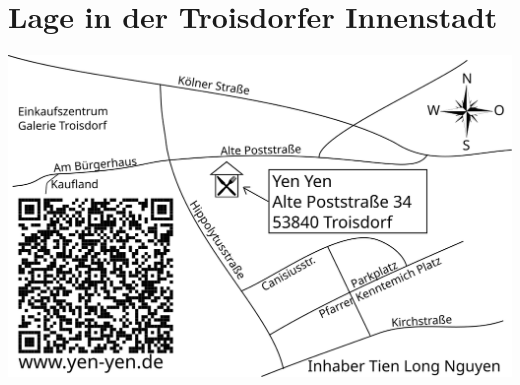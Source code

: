 \documentclass[a4paper,10pt,notumble]{leaflet}
\begin{document}
\section*{Lage in der Troisdorfer Innenstadt}
\begin{center}
\includegraphics[width=1.0\textwidth]{gfx/map/tdfcity}\\
\end{center}
\end{document}
